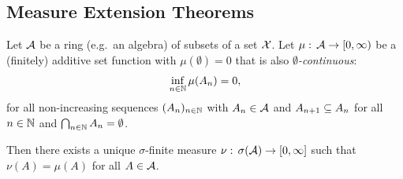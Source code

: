 \subsection{Measure Extension Theorems}

\begin{Thm}
    \label{thm:ext-thm-2}
    Let $\mathcal{A}$ be a ring (e.g.\ an algebra) of subsets of a set $\mathcal{X}$.
    Let $\mu:\, \mathcal{A} \to [0,\infty)$ be a (finitely) additive set function 
    with $\mu(\emptyset) =0$ that is also
    \emph{$\emptyset$-continuous}:
    \begin{align}
        \inf_{n \in \mathbb{N}} \mu(A_n) = 0, 
    \end{align}
    for all non-increasing sequences $(A_n)_{n \in \mathbb{N}}$ with $A_n \in \mathcal{A}$ and $A_{n+1} \subseteq A_n$ for all $n \in \mathbb{N}$ and $\bigcap_{n \in \mathbb{N}} A_n = \emptyset$.

    Then there exists a unique $\sigma$-finite measure $\nu:\, \sigma(\mathcal{A}) \to [0,\infty]$ such that $\nu(A) = \mu(A)$ for all $A \in \mathcal{A}$.
\end{Thm}



